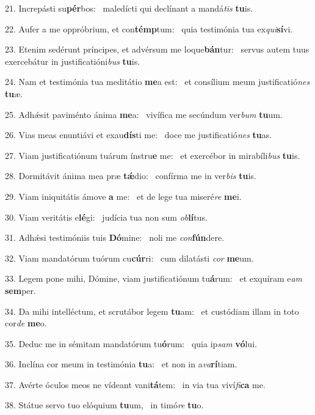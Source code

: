 21. Increpásti su\textbf{pér}bos: \ast\  maledícti qui declínant a mandá\textit{tis} \textbf{tu}is.\

22. Aufer a me oppróbrium, et con\textbf{témp}tum: \ast\  quia testimónia tua ex\textit{qui}\textbf{sí}vi.\

23. Etenim sedérunt príncipes, et advérsum me loque\textbf{bán}tur: \ast\  servus autem tuus exercebátur in justificatióni\textit{bus} \textbf{tu}is.\

24. Nam et testimónia tua meditátio \textbf{me}a est: \ast\  et consílium meum justificatió\textit{nes} \textbf{tu}æ.\

25. Adhǽsit paviménto ánima \textbf{me}a: \ast\  vivífica me secúndum ver\textit{bum} \textbf{tu}um.\

26. Vias meas enuntiávi et exau\textbf{dís}ti me: \ast\  doce me justificatió\textit{nes} \textbf{tu}as.\

27. Viam justificatiónum tuárum ínstru\textbf{e} me: \ast\  et exercébor in mirabíli\textit{bus} \textbf{tu}is.\

28. Dormitávit ánima mea præ \textbf{tǽ}dio: \ast\  confírma me in ver\textit{bis} \textbf{tu}is.\

29. Viam iniquitátis ámove \textbf{a} me: \ast\  et de lege tua miseré\textit{re} \textbf{me}i.\

30. Viam veritátis e\textbf{lé}gi: \ast\  judícia tua non sum \textit{ob}\textbf{lí}tus.\

31. Adhǽsi testimóniis tuis \textbf{Dó}mine: \ast\  noli me \textit{con}\textbf{fún}dere.\

32. Viam mandatórum tuórum cu\textbf{cúr}ri: \ast\  cum dilatásti \textit{cor} \textbf{me}um.\

33. Legem pone mihi, Dómine, viam justificatiónum tu\textbf{á}rum: \ast\  et exquíram e\textit{am} \textbf{sem}per.\

34. Da mihi intelléctum, et scrutábor legem \textbf{tu}am: \ast\  et custódiam illam in toto cor\textit{de} \textbf{me}o.\

35. Deduc me in sémitam mandatórum tu\textbf{ó}rum: \ast\  quia ip\textit{sam} \textbf{vó}lui.\

36. Inclína cor meum in testimónia \textbf{tu}a: \ast\  et non in a\textit{va}\textbf{rí}tiam.\

37. Avérte óculos meos ne vídeant vani\textbf{tá}tem: \ast\  in via tua viví\textit{fi}\textbf{ca} me.\

38. Státue servo tuo elóquium \textbf{tu}um, \ast\  in timó\textit{re} \textbf{tu}o.\

